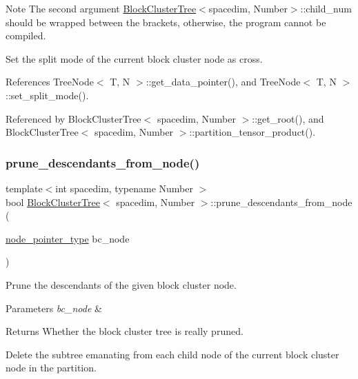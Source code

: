 \begin{DoxyDescription}
\item[Note ]The second argument {\ttfamily \hyperlink{classBlockClusterTree}{Block\+Cluster\+Tree}$<$spacedim}, Number$>$\+::child\+\_\+num should be wrapped between the brackets, otherwise, the program cannot be compiled. 
\end{DoxyDescription}

Set the split mode of the current block cluster node as cross.

References Tree\+Node$<$ T, N $>$\+::get\+\_\+data\+\_\+pointer(), and Tree\+Node$<$ T, N $>$\+::set\+\_\+split\+\_\+mode().



Referenced by Block\+Cluster\+Tree$<$ spacedim, Number $>$\+::get\+\_\+root(), and Block\+Cluster\+Tree$<$ spacedim, Number $>$\+::partition\+\_\+tensor\+\_\+product().

\mbox{\label{classBlockClusterTree_a6fd771b68a4c7195151f6dc02e8ec7e9}} 
\subsubsection{\texorpdfstring{prune\+\_\+descendants\+\_\+from\+\_\+node()}{prune\_descendants\_from\_node()}}
{\footnotesize\ttfamily template$<$int spacedim, typename Number $>$ \\
bool \hyperlink{classBlockClusterTree}{Block\+Cluster\+Tree}$<$ spacedim, Number $>$\+::prune\+\_\+descendants\+\_\+from\+\_\+node (\begin{DoxyParamCaption}\item[{\hyperlink{classTreeNode}{node\+\_\+pointer\+\_\+type}}]{bc\+\_\+node }\end{DoxyParamCaption})}

Prune the descendants of the given block cluster node. 
\begin{DoxyParams}{Parameters}
{\em bc\+\_\+node} & \\
\hline
\end{DoxyParams}
\begin{DoxyReturn}{Returns}
Whether the block cluster tree is really pruned. 
\end{DoxyReturn}
Delete the subtree emanating from each child node of the current block cluster node in the partition.

